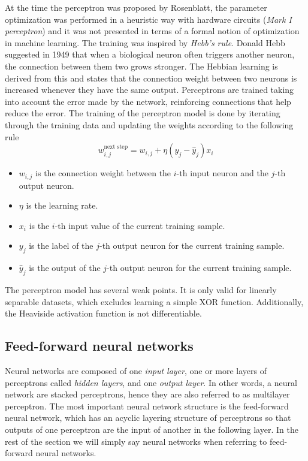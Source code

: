 At the time the perceptron was proposed by Rosenblatt, the parameter optimization was performed in a heuristic way with hardware circuits (\textit{Mark I perceptron}) and it was not presented in terms of a formal notion of optimization in machine learning. The training was inspired by \textit{Hebb's rule}. Donald Hebb suggested in 1949 \cite{hebb2005organization} that when a biological neuron often triggers another neuron, the connection between them two grows stronger. The Hebbian learning is derived from this and states that the connection weight between two neurons is increased whenever they have the same output. Perceptrons are trained taking into account the error made by the network, reinforcing connections that help reduce the error. The training of the perceptron model is done by iterating through the training data and updating the weights according to the following rule
\begin{equation}
    w_{i,j}^{\text{next step}} = w_{i,j} + \eta (y_j - \hat{y}_j) x_i
\end{equation}
\begin{itemize}
    \item $w_{i,j}$ is the connection weight between the $i$-th input neuron and the $j$-th output neuron.
    
    \item $\eta$ is the learning rate.
    
    \item $x_i$ is the $i$-th input value of the current training sample.
    
    \item $y_j$ is the label of the $j$-th output neuron for the current training sample.
    
    \item $\hat{y}_j$ is the output of the $j$-th output neuron for the current training sample. 
\end{itemize}

The perceptron model has several weak points. It is only valid for linearly separable datasets, which excludes learning a simple XOR function. Additionally, the Heaviside activation function is not differentiable.  

\subsection{Feed-forward neural networks}

Neural networks are composed of one \textit{input layer}, one or more layers of perceptrons called  \textit{ hidden layers}, and one \textit{output layer}. In other words, a neural network are stacked perceptrons, hence they are also referred to as multilayer perceptron. The most important neural network structure is the feed-forward neural network, which has an acyclic layering structure of perceptrons so that outputs of one perceptron are the input of another in the following layer.  In the rest of the section we will simply say neural networks when referring to feed-forward neural networks.

